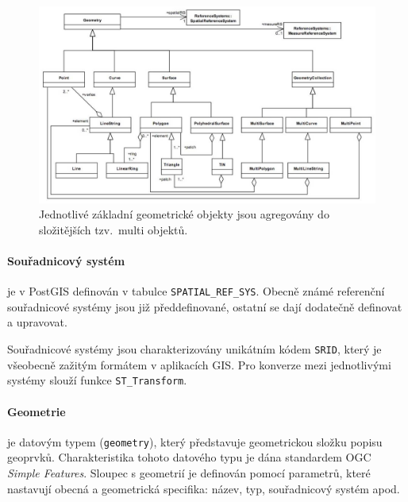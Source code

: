\documentclass[a4paper,12pt,oneside]{report}
\begin{document}
\begin{figure}[h!]
    \centering
    \includegraphics[width=1\textwidth]{./img/implementace/ogc1.jpg}
    \caption[Model PostGIS]{\centering Jednotlivé základní geometrické objekty 
    jsou agregovány do složitějších tzv.~multi objektů.     \footnotemark}
 \end{figure}   

\paragraph*{Souřadnicový systém} je v PostGIS definován v tabulce
\texttt{SPATIAL\_REF\_SYS}. Obecně známé referenční souřadnicové systémy jsou již
předdefinované, ostatní se dají dodatečně definovat a upravovat.


Souřadnicové systémy jsou charakterizovány unikátním kódem
\texttt{\acs{SRID}}, který je všeobecně zažitým formátem v aplikacích GIS.
Pro konverze mezi jednotlivými systémy slouží funkce
\texttt{ST\_Transform}.

\paragraph*{Geometrie} je datovým typem (\texttt{geometry}), který
představuje geometrickou složku popisu geoprvků.  Charakteristika tohoto
datového typu je dána standardem OGC \textit{Simple Features}.
Sloupec s geometrií je definován pomocí parametrů, které
nastavují obecná a geometrická specifika: název, typ, souřadnicový
systém apod.
\end{document}
